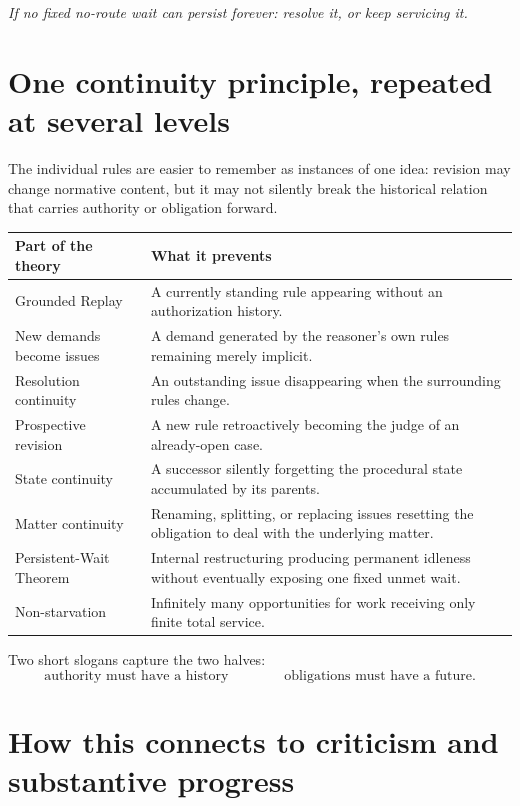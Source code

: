 \documentclass[11pt]{article}
\theoremstyle{definition}
\theoremstyle{remark}
\begin{document}
\begin{center}
\emph{If no fixed no-route wait can persist forever: resolve it, or keep servicing it.}
\end{center}

\section{One continuity principle, repeated at several levels}\label{sec:picture}

The individual rules are easier to remember as instances of one idea:
revision may change normative content, but it may not silently break the
historical relation that carries authority or obligation forward.

\begin{center}
\begin{tabular}{@{}p{}p{}@{}}
\toprule
\textbf{Part of the theory} & \textbf{What it prevents} \\
\midrule
Grounded Replay & A currently standing rule appearing without an authorization history. \\
New demands become issues & A demand generated by the reasoner's own rules remaining merely implicit. \\
Resolution continuity & An outstanding issue disappearing when the surrounding rules change. \\
Prospective revision & A new rule retroactively becoming the judge of an already-open case. \\
State continuity & A successor silently forgetting the procedural state accumulated by its parents. \\
Matter continuity & Renaming, splitting, or replacing issues resetting the obligation to deal with the underlying matter. \\
Persistent-Wait Theorem & Internal restructuring producing permanent idleness without eventually exposing one fixed unmet wait. \\
Non-starvation & Infinitely many opportunities for work receiving only finite total service. \\
\bottomrule
\end{tabular}
\end{center}

Two short slogans capture the two halves:
\[
 \boxed{\text{authority must have a history}}
 \qquad\qquad
 \boxed{\text{obligations must have a future}}.
\]

\section{How this connects to criticism and substantive progress}\label{sec:updown}
\end{document}
